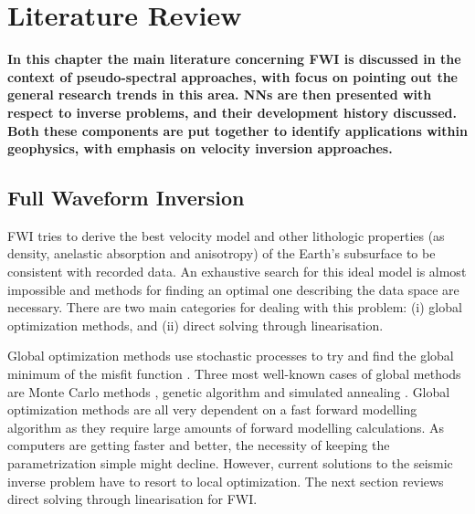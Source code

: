 \chapter{Literature Review}
\textbf{In this chapter the main literature concerning FWI is discussed in the context of pseudo-spectral approaches, with focus on pointing out the general research trends in this area. \acp{NN} are then presented with respect to inverse problems, and their development history discussed. Both these components are put together to identify applications within geophysics, with emphasis on velocity inversion approaches.}

\section{Full Waveform Inversion}\label{sec:lit_rev_fwi}
\ac{FWI} tries to derive the best velocity model and other lithologic properties (as density, anelastic absorption and anisotropy) of the Earth’s subsurface to be consistent with recorded data. An exhaustive search for this ideal model is almost impossible and methods for finding an optimal one describing the data space are necessary. There are two main categories for dealing with this problem: (i) global optimization methods, and (ii) direct solving through linearisation.

Global optimization methods use stochastic processes to try and find the global minimum of the misfit function \citep{Torn1989, Sen1995}. Three most well-known cases of global methods are Monte Carlo methods \citep{Press1968, Biswas2017}, genetic algorithm \citep{Gerstoft1994, Parker1999, Tran2012} and simulated annealing \citep{Rothman1985, Pullammanappallil1994, Tran2011}. Global optimization methods are all very dependent on a fast forward modelling algorithm as they require large amounts of forward modelling calculations. As computers are getting faster and better, the necessity of keeping the parametrization simple might decline. However, current solutions to the seismic inverse problem have to resort to local optimization. The next section reviews direct solving through linearisation for FWI.

